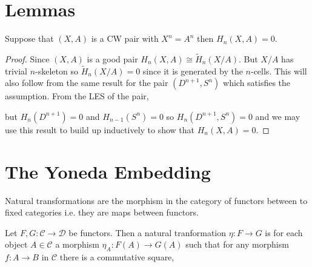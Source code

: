 \documentclass[12pt]{extarticle}
\begin{document}
\section{Lemmas}

\begin{lemma} \label{pair_equal_skeleton_zero_rel_homology}
Suppose that $(X, A)$ is a CW pair with $X^n = A^n$ then $H_n(X, A) = 0$. 
\end{lemma}

\begin{proof}
Since $(X, A)$ is a good pair $H_n(X, A) \cong \tilde{H}_n(X/A)$. But $X/A$ has trivial $n$-skeleton so $\tilde{H}_n(X/A) = 0$ since it is generated by the $n$-cells. This will also follow from the same result for the pair $(D^{n+1}, S^n)$ which satisfies the assumption. From the LES of the pair,
\begin{center}
\end{center}
but $H_n(D^{n+1}) = 0$ and $H_{n-1}(S^n) = 0$ so $H_{n}(D^{n+1}, S^n) = 0$ and we may use this result to build up inductively to show that  $H_n(X, A) = 0$. 
\end{proof}

\section{The Yoneda Embedding}

\newcommand{\C}{\mathcal{C}}
\newcommand{\D}{\mathcal{D}}
Natural transformations are the morphism in the category of functors between to fixed categories i.e. they are maps between functors.

\begin{defn}
Let $F, G : \C \to \D$ be functors. Then a natural tranformation $\eta : F \to G$ is for each object $A \in \C$ a morphism $\eta_A : F(A) \to G(A)$ such that for any morphism $f : A \to B$ in $\C$ there is a commutative square,
\begin{center}
\end{center}
\end{defn}
\end{document}
